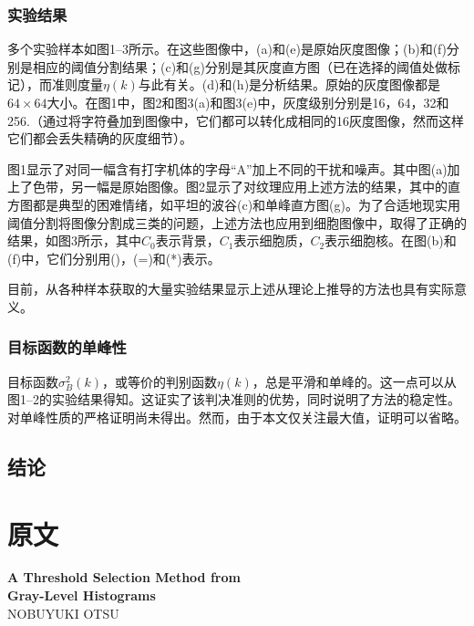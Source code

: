 \subsubsection*{实验结果}

多个实验样本如图1--3所示。在这些图像中，(a)和(e)是原始灰度图像；(b)和(f)分别是相应的阈值分割结果；(c)和(g)分别是其灰度直方图（已在选择的阈值处做标记），而准则度量$\eta(k)$与此有关。(d)和(h)是分析结果。原始的灰度图像都是$64\times 64$大小。在图1中，图2和图3(a)和图3(e)中，灰度级别分别是16，64，32和256.（通过将字符叠加到图像中，它们都可以转化成相同的16灰度图像，然而这样它们都会丢失精确的灰度细节）。

图1显示了对同一幅含有打字机体的字母“A”加上不同的干扰和噪声。其中图(a)加上了色带，另一幅是原始图像。图2显示了对纹理应用上述方法的结果，其中的直方图都是典型的困难情绪，如平坦的波谷(c)和单峰直方图(g)。为了合适地现实用阈值分割将图像分割成三类的问题，上述方法也应用到细胞图像中，取得了正确的结果，如图3所示，其中$C_0$表示背景，$C_1$表示细胞质，$C_2$表示细胞核。在图(b)和(f)中，它们分别用()，(=)和(*)表示。

目前，从各种样本获取的大量实验结果显示上述从理论上推导的方法也具有实际意义。

\subsubsection*{目标函数的单峰性}

目标函数$\sigma_B^2(k)$，或等价的判别函数$\eta(k)$，总是平滑和单峰的。这一点可以从图1--2的实验结果得知。这证实了该判决准则的优势，同时说明了方法的稳定性。对单峰性质的严格证明尚未得出。然而，由于本文仅关注最大值，证明可以省略。

\subsection*{结论}


\section*{原文}

\begin{center}
 \Large \textbf{A Threshold Selection Method from \\ Gray-Level Histograms}\\[10pt]
\normalsize NOBUYUKI OTSU\\[10pt]
\end{center}

